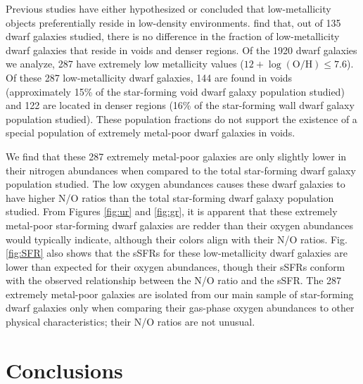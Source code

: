 Previous studies have either hypothesized \citep{Pustilnik06,Pustilnik11b,
Pustilnik13} or concluded \citep{Filho15} that low-metallicity objects 
preferentially reside in low-density environments.  \cite{Douglass17a} find 
that, out of 135 dwarf galaxies studied, there is no difference in the fraction 
of low-metallicity dwarf galaxies that reside in voids and denser regions.  Of 
the 1920 dwarf galaxies we analyze, 287 have extremely low metallicity values 
($12 + \log (\text{O}/\text{H}) \leq 7.6$).  Of these 287 low-metallicity dwarf 
galaxies, 144 are found in voids (approximately 15\% of the star-forming void 
dwarf galaxy population studied) and 122 are located in denser regions (16\% of 
the star-forming wall dwarf galaxy population studied).  These population 
fractions do not support the existence of a special population of extremely 
metal-poor dwarf galaxies in voids.

We find that these 287 extremely metal-poor galaxies are only slightly lower in 
their nitrogen abundances when compared to the total star-forming dwarf galaxy 
population studied.  The low oxygen abundances causes these dwarf galaxies to 
have higher N/O ratios than the total star-forming dwarf galaxy population 
studied.  From Figures \ref{fig:ur} and \ref{fig:gr}, it is apparent that these 
extremely metal-poor star-forming dwarf galaxies are redder than their oxygen 
abundances would typically indicate, although their colors align with their N/O 
ratios.  Fig. \ref{fig:SFR} also shows that the sSFRs for these low-metallicity 
dwarf galaxies are lower than expected for their oxygen abundances, though their 
sSFRs conform with the observed relationship between the N/O ratio and the sSFR.  
The 287 extremely metal-poor galaxies are isolated from our main sample of 
star-forming dwarf galaxies only when comparing their gas-phase oxygen 
abundances to other physical characteristics; their N/O ratios are not unusual.


%
%
\section{Conclusions}

